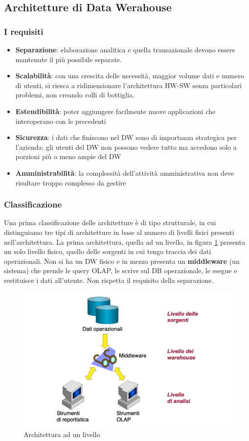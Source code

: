 \subsection{Architetture di Data Werahouse}
\subsubsection{I requisiti}
\begin{itemize}
	\item 
	\textbf{Separazione}: elaborazione analitica e quella transazionale devono essere mantenute il più possibile separate. 
	\item
	\textbf{Scalabilità}: con una crescita delle necessità, maggior volume dati e numero di utenti, si riesca a ridimensionare l’architettura HW-SW senza particolari problemi, non creando colli di bottiglia. 
	\item
	\textbf{Estendibilità}: poter aggiungere facilmente nuove applicazioni che interoperano con le precedenti
	\item
	\textbf{Sicurezza}: i dati che finiscono nel DW sono di importanza strategica per l’azienda; gli utenti del DW non possono vedere tutto ma accedono solo a porzioni più o meno ampie del DW
	\item
	\textbf{Amministrabilità}: la complessità dell’attività amministrativa non deve risultare troppo complesso da gestire
\end{itemize}
\subsubsection{Classificazione}

Una prima classificazione delle architetture è di tipo strutturale, in cui distinguiamo tre tipi di architetture in base al numero di livelli fisici presenti nell’architettura. 
La prima architettura, quella ad un livello, in figura \ref{fig:arch1} presenta un solo livello fisico, quello delle sorgenti in cui tengo traccia dei dati operazionali. Non si ha un DW fisico e in mezzo presenta un \textbf{middleware} (un sistema) che prende le query OLAP, le scrive sul DB operazionale, le esegue e restituisce i dati all’utente. Non rispetta il requisito della separazione.
\begin{figure}[H]
	\centering
	\includegraphics[width=0.6\linewidth]{img/arch1}
	\caption{Architettura ad un livello}
	\label{fig:arch1}
\end{figure}

